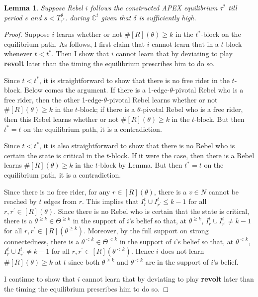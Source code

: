 \documentclass[12pt,letter]{article}
\newcommand{\Kappa}{\mathbb{C}}
\newtheorem{lemma}{Lemma}[section]
\theoremstyle{definition}
\theoremstyle{definition}
\theoremstyle{remark}
\theoremstyle{claim}
\begin{document}
\begin{lemma} Suppose Rebel $i$ follows the constructed APEX equilibrium $\tau^{*}$ till period $s$ and $s<T^{\theta}_{\tau^{*}}$. during $\Kappa^t$ given that $\delta$ is sufficiently high.
\end{lemma}
\begin{proof}

Suppose $i$ learns whether or not $\#[R](\theta)\geq k$ in the $t^{*}$-block on the equilibrium path. As follows, I first claim that $i$ cannot learn that in a $t$-block whenever $t<t^{*}$. Then I show that $i$ cannot learn that by deviating to play \textbf{revolt} later than the timing the equilibrium prescribes him to do so.   

Since $t<t^{*}$, it is straightforward to show that there is no free rider in the $t$-block. Below comes the argument. If there is a 1-edge-$\theta$-pivotal Rebel who is a free rider, then the other 1-edge-$\theta$-pivotal Rebel learns whether or not $\#[R](\theta)\geq k$ in the $t$-block; if there is a $\theta$-pivotal Rebel who is a free rider, then this Rebel learns whether or not $\#[R](\theta)\geq k$ in the $t$-block. But then $t^{*}=t$ on the equilibrium path, it is a contradiction. 

Since $t<t^{*}$, it is also straightforward to show that there is no Rebel who is certain the state is critical in the $t$-block. If it were the case, then there is a Rebel learns $\#[R](\theta)\geq k$ in the $t$-block by Lemma. But then $t^{*}=t$ on the equilibrium path, it is a contradiction. 

Since there is no free rider, for any $r\in [R](\theta)$, there is a $v\in N$ cannot be reached by $t$ edges from $r$. This implies that $I^{t}_r\cup I^{t}_{r^{'}}\leq k-1$ for all $r,r^{'}\in [R](\theta)$. Since there is no Rebel who is certain that the state is critical, there is a $\theta^{\geq k}\in \Theta^{\geq k}$ in the support of $i$'s belief so that, at $\theta^{\geq k}$, $I^{t}_r\cup I^{t}_{r^{'}}\neq k-1$ for all $r,r^{'}\in [R](\theta^{\geq k})$. Moreover, by the full support on strong connectedness, there is a $\theta^{< k}\in \Theta^{< k}$ in the support of $i$'s belief so that, at $\theta^{< k}$, $I^{t}_r\cup I^{t}_{r^{'}}\neq k-1$ for all $r,r^{'}\in [R](\theta^{< k})$. Hence $i$ does not learn $\#[R](\theta)\geq k$ at $t$ since both $\theta^{\geq k}$ and $\theta^{<k}$ are in the support of $i$'s belief. 

I continue to show that $i$ cannot learn that by deviating to play \textbf{revolt} later than the timing the equilibrium prescribes him to do so. 


\end{proof}
\end{document}
